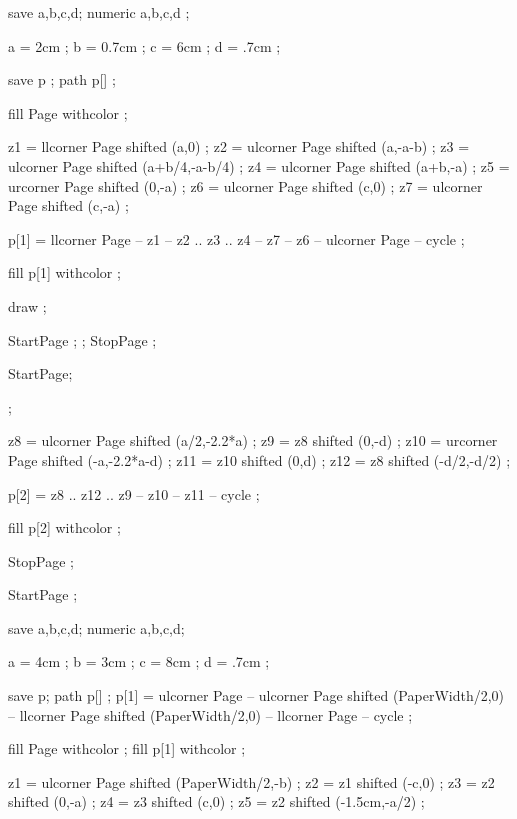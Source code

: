 save a,b,c,d;
numeric a,b,c,d ;

a = 2cm ;   b = 0.7cm ;
c = 6cm ;   d = .7cm ;

save p ; path p[] ;

fill Page withcolor  ;

z1 = llcorner Page shifted (a,0) ;
z2 = ulcorner Page shifted (a,-a-b) ;
z3 = ulcorner Page shifted (a+b/4,-a-b/4) ;
z4 = ulcorner Page shifted (a+b,-a) ;
z5 = urcorner Page shifted (0,-a) ;
z6 = ulcorner Page shifted (c,0) ;
z7 = ulcorner Page shifted (c,-a) ;


p[1] = llcorner Page -- z1 -- z2 .. z3 .. z4 -- z7 -- z6 -- 
       ulcorner Page -- cycle ;

fill p[1] withcolor  ;

draw  ;

\stopuseMPgraphic

StartPage ;
 ;
StopPage ;
\stopuseMPgraphic

StartPage;

 ;

z8 = ulcorner Page shifted (a/2,-2.2*a) ;
z9 = z8 shifted (0,-d) ;
z10 = urcorner Page shifted (-a,-2.2*a-d) ;
z11 = z10 shifted (0,d) ;
z12 = z8 shifted (-d/2,-d/2) ;

p[2] = z8 .. z12 .. z9 -- z10 -- z11 -- cycle ;

fill p[2] withcolor  ;

StopPage ;
\stopuseMPgraphic

StartPage ;

save a,b,c,d;
numeric a,b,c,d;

a = 4cm ;   b = 3cm ;
c = 8cm ;   d = .7cm ;

save p; path p[] ;
p[1] = ulcorner Page -- ulcorner Page shifted (PaperWidth/2,0) -- 
       llcorner Page shifted (PaperWidth/2,0) -- llcorner Page -- cycle ;

fill Page withcolor  ;
fill p[1] withcolor  ;

z1 = ulcorner Page shifted (PaperWidth/2,-b) ;
z2 = z1 shifted (-c,0) ;
z3 = z2 shifted (0,-a) ;
z4 = z3 shifted (c,0) ;
z5 = z2 shifted (-1.5cm,-a/2) ;

